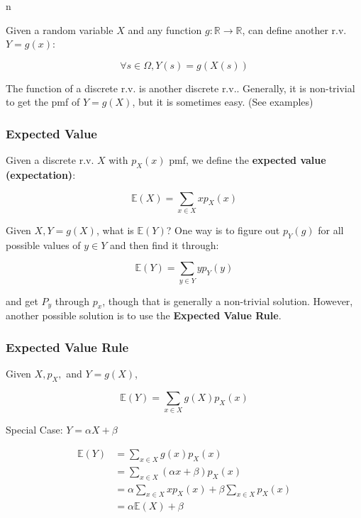n\documentclass{article}
\begin{document}
Given a random variable $X$ and any function $g : \mathbb{R}
\rightarrow \mathbb{R}$, can define another r.v. $Y = g(x)$:

\[
  \forall s \in \Omega, Y(s) = g(X(s))
\]

The function of a discrete r.v. is another discrete r.v.. Generally,
it is non-trivial to get the pmf of $Y=g(X)$, but it is sometimes
easy. (See examples)

\subsubsection{Expected Value}

Given a discrete r.v. $X$ with $p_X(x)$ pmf, we define the
\textbf{expected value (expectation)}:

\begin{equation}
  \tag{Expected Value Definition}
  \boxed{
    \mathbb{E}(X) = \sum\limits_{x \in X} x p_X(x)
  }
\end{equation}

Given $X, Y = g(X)$, what is $\mathbb{E}(Y)$? One way is to figure out
$p_Y(g)$ for all possible values of $y \in Y$ and then find it
through:

\[
  \mathbb{E}(Y) = \sum\limits_{y \in Y} y p_Y(y)
\]

and get $P_y$ through $p_x$, though that is generally a non-trivial
solution. However, another possible solution is to use the
\textbf{Expected Value Rule}.

\subsubsection{Expected Value Rule}

Given $X, p_X,$ and $Y=g(X)$,

\begin{equation}
  \tag{Expected Value Rule}
  \boxed{
    \mathbb{E}(Y) = \sum\limits_{x \in X} g(X) p_X(x)
  }
\end{equation}

Special Case: $Y = \alpha X + \beta$

\[
  \begin{aligned}
    \mathbb{E}(Y)
    &= \sum\limits_{x \in X} g(x) p_X(x) \\
    &= \sum\limits_{x \in X} (\alpha x + \beta) p_X(x) \\
    &= \alpha \sum\limits_{x \in X} x p_X(x) + \beta \sum\limits_{x
      \in X} p_X(x) \\
    &= \alpha \mathbb{E}(X) + \beta    
  \end{aligned}
\]
\end{document}
